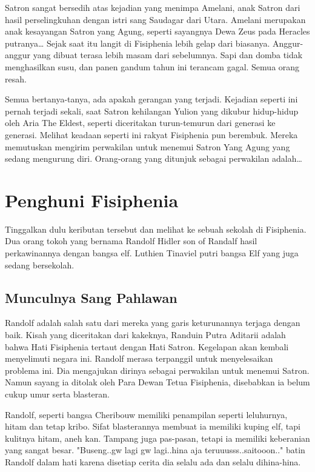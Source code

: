 \documentclass[a4paper,11pt,final]{article}
\begin{document}
Satron sangat bersedih atas kejadian yang menimpa Amelani, anak Satron 
dari hasil perselingkuhan dengan istri sang Saudagar dari Utara. 
Amelani merupakan anak kesayangan Satron yang Agung, seperti sayangnya 
Dewa Zeus pada Heracles putranya\ldots
Sejak saat itu langit di Fisiphenia lebih gelap dari biasanya. 
Anggur-anggur yang dibuat terasa lebih masam dari sebelumnya. 
Sapi dan domba tidak menghasilkan susu, dan panen gandum tahun ini 
terancam gagal. 
Semua orang resah.

Semua bertanya-tanya, ada apakah gerangan yang terjadi. 
Kejadian seperti ini pernah terjadi sekali, saat Satron kehilangan 
Yulion yang dikubur hidup-hidup oleh Aria The Eldest, seperti diceritakan 
turun-temurun dari generasi ke generasi.
Melihat keadaan seperti ini rakyat Fisiphenia pun berembuk. 
Mereka memutuskan mengirim perwakilan untuk menemui Satron Yang Agung 
yang sedang mengurung diri. 
Orang-orang yang ditunjuk sebagai perwakilan adalah\ldots

\section{Penghuni Fisiphenia}
Tinggalkan dulu keributan tersebut dan melihat ke sebuah sekolah di 
Fisiphenia. 
Dua orang tokoh yang bernama Randolf Hidler son of Randalf hasil 
perkawinannya dengan bangsa elf. 
Luthien Tinaviel putri bangsa Elf yang juga sedang bersekolah.

\subsection{Munculnya Sang Pahlawan}

Randolf adalah salah satu dari mereka yang garis keturunannya 
terjaga dengan baik. 
Kisah yang diceritakan dari kakeknya, Randuin Putra Aditarii 
adalah bahwa Hati Fisiphenia tertaut dengan Hati Satron. 
Kegelapan akan kembali menyelimuti negara ini. 
Randolf merasa terpanggil untuk menyelesaikan problema ini. 
Dia mengajukan dirinya sebagai perwakilan untuk menemui Satron. 
Namun sayang ia ditolak oleh Para Dewan Tetua Fisiphenia, 
disebabkan ia belum cukup umur serta blasteran.

Randolf, seperti bangsa Cheribouw memiliki penampilan seperti 
leluhurnya, hitam dan tetap kribo. 
Sifat blasterannya membuat ia memiliki kuping elf, tapi kulitnya 
hitam, aneh kan. 
Tampang juga pas-pasan, tetapi ia memiliki keberanian yang 
sangat besar.
"Buseng..gw lagi gw lagi..hina aja teruuusss..saitooon.." 
batin Randolf dalam hati karena disetiap cerita dia selalu ada 
dan selalu dihina-hina.
\end{document}
